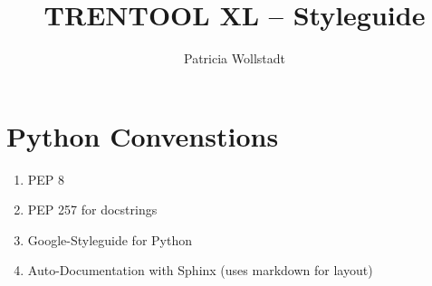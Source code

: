 \documentclass[%
10pt,								%
]
{scrartcl}
\begin{document}
\pagestyle{empty} %




\title{TRENTOOL XL -- Styleguide}
\author{Patricia Wollstadt}







\section{Python Convenstions}

\begin{enumerate}
    \item PEP 8
    \item PEP 257 for docstrings
    \item Google-Styleguide for Python
    \item Auto-Documentation with Sphinx (uses markdown for layout) 
\end{enumerate}
\end{document}

